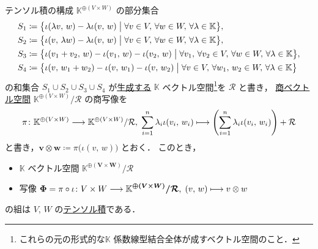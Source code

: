 \documentclass[rep_main]{subfiles}
\begin{document}
\begin{myprop}[label=prop:tensor-vec, breakable]{テンソル積の構成}
	$\mathbb{K}^{\oplus (V \times W)}$ の部分集合
	\begin{align}
		S_1 &\coloneqq \bigl\{\iota(\lambda v,\, w) - \lambda \iota(v,\, w) \bigm| \forall v \in V,\, \forall w \in W,\, \forall \lambda \in \mathbb{K} \bigr\} , \\
		S_2 &\coloneqq \bigl\{\iota(v,\, \lambda w) - \lambda \iota(v,\, w) \bigm| \forall v \in V,\, \forall w \in W,\, \forall \lambda \in \mathbb{K} \bigr\}, \\
		S_3 &\coloneqq \bigl\{\iota(v_1 + v_2,\, w) - \iota(v_1,\, w) - \iota(v_2,\, w) \bigm| \forall v_1,\, \forall v_2 \in V,\, \forall w \in W,\, \forall \lambda \in \mathbb{K} \bigr\}, \\
		S_4 &\coloneqq \bigl\{\iota(v,\, w_1 + w_2) - \iota(v,\, w_1) - \iota(v,\, w_2) \bigm| \forall v \in V,\, \forall w_1,\, w_2 \in W,\, \forall \lambda \in \mathbb{K} \bigr\}
	\end{align}
	の和集合 $S_1 \cup S_2 \cup S_3 \cup S_4$ が\hyperref[prop:gen-submodule]{生成する} $\mathbb{K}$ ベクトル空間\footnote{これらの元の形式的な$\mathbb{K}$ 係数線型結合全体が成すベクトル空間のこと．}を $\mathcal{R}$ と書き，
	\hyperref[prop:quotient-vec]{商ベクトル空間}
	$\mathbb{K}^{\oplus (V \times W)} / \mathcal{R}$ 
	の商写像を
	\begin{align}
		\pi \colon \mathbb{K}^{\oplus (V \times W)} \longrightarrow \mathbb{K}^{\oplus (V \times W)} / \mathcal{R},\; \sum_{i=1}^n \lambda_i \iota(v_i,\, w_i) \longmapsto \left( \sum_{i=1}^n \lambda_i \iota(v_i,\, w_i) \right) + \mathcal{R}
	\end{align}
	と書き，$\bm{v \otimes w} \coloneqq \pi \bigl( \iota (v,\, w) \bigr)$ とおく．
	このとき，
	\begin{itemize}
		\item $\mathbb{K}$ ベクトル空間 $\bm{\mathbb{K}^{\oplus (V \times W)} / \mathcal{R}}$
		\item 写像 $\bm{\Phi} = \pi \circ \iota \colon V \times W \longrightarrow \bm{\mathbb{K}^{\oplus (V \times W)} / \mathcal{R}},\; (v,\, w) \longmapsto v \otimes w$
	\end{itemize}
	の組は $V,\, W$ の\hyperref[def:tensor-vec]{テンソル積}である．
\end{myprop}
\end{document}
